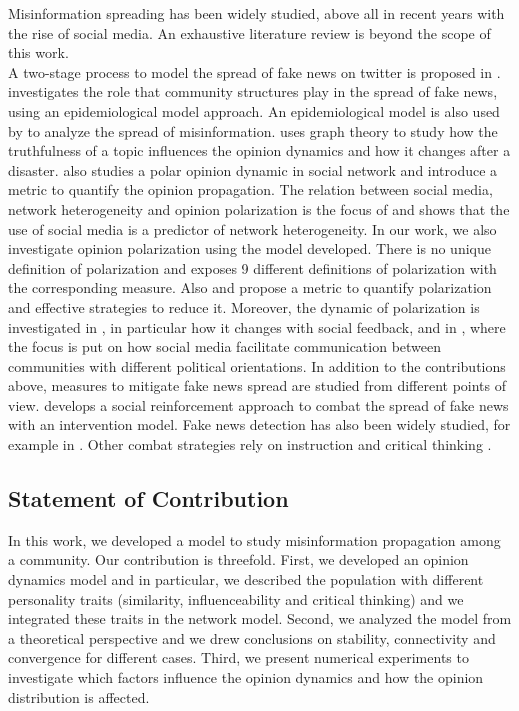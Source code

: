 Misinformation spreading has been widely studied, above all in recent years with the rise of social media. An exhaustive literature review is beyond the scope of this work.\\

A two-stage process to model the spread of fake news on twitter is proposed in \cite{Murayama2021}. \cite{Rath2019} investigates the role that community structures play in the spread of fake news, using an epidemiological model approach. An epidemiological model is also used by \cite{Tambuscio2015} to analyze the spread of misinformation. \cite{Hashimoto2021} uses graph theory to study how the truthfulness of a topic influences the opinion dynamics and how it changes after a disaster. \cite{Amelkin2017} also studies a polar opinion dynamic in social network and introduce a metric to quantify the opinion propagation. The relation between social media, network heterogeneity and opinion polarization is the focus of \cite{Lee2014a} and shows that the use of social media is a predictor of network heterogeneity. In our work, we also investigate opinion polarization using the model developed. There is no unique definition of polarization and \cite{Bramsona2016} exposes 9 different definitions of polarization with the corresponding measure. Also \cite{Akoglu2014} and \cite{Matakos2017} propose a metric to quantify polarization and effective strategies to reduce it. Moreover, the dynamic of polarization is investigated in \cite{Banisch2019}, in particular how it changes with social feedback, and in \cite{Conover2011}, where the focus is put on how social media facilitate communication between communities with different political orientations. In addition to the contributions above, measures to mitigate fake news spread are studied from different points of view. \cite{mahak2020} develops a social reinforcement approach to combat the spread of fake news with an intervention model. Fake news detection has also been widely studied, for example in \cite{Vijjali2020}\cite{improved}\cite{Zhou2020}\cite{Maryam2019}. Other combat strategies rely on instruction and critical thinking \cite{joanna2017}.


\subsection{Statement of Contribution}

In this work, we developed a model to study misinformation propagation among a community. Our contribution is threefold. First, we developed an opinion dynamics model and in particular, we described the population with different personality traits (similarity, influenceability and critical thinking) and we integrated these traits in the network model. Second, we analyzed the model from a theoretical perspective and we drew conclusions on stability, connectivity and convergence for different cases. Third, we present numerical experiments to investigate which factors influence the opinion dynamics and how the opinion distribution is affected. 




